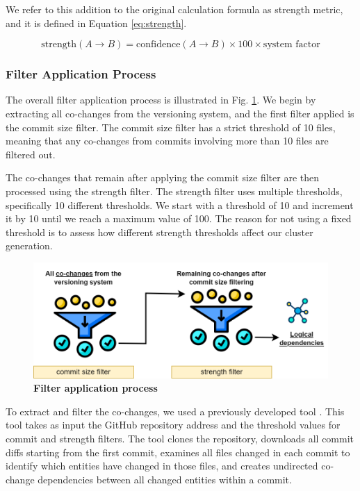 \documentclass{ieeeaccess}
\begin{document}
We refer to this addition to the original calculation formula as strength metric, and it is defined in Equation \eqref{eq:strength}.

\begin{equation}
\text{strength}(A \rightarrow B) = \text{confidence}(A \rightarrow B) \times 100 \times \text{system factor} 
\label{eq:strength}
\end{equation}


\subsubsection{Filter Application Process}

The overall filter application process is illustrated in Fig. \ref{fig:filtering}.  We begin by extracting all co-changes from the versioning system, and the first filter applied is the commit size filter. The commit size filter has a strict threshold of 10 files, meaning that any co-changes from commits involving more than 10 files are filtered out.

The co-changes that remain after applying the commit size filter are then processed using the strength filter. The strength filter uses multiple thresholds, specifically 10 different thresholds. We start with a threshold of 10 and increment it by 10 until we reach a maximum value of 100. The reason for not using a fixed threshold is to assess how different strength thresholds affect our cluster generation. 

\begin{figure}[t!]
  \centering
  \includegraphics[width=\columnwidth]{filtering.png}
  \caption{ \textbf{Filter application process}}
  \label{fig:filtering}
\end{figure}

To extract and filter the co-changes, we used a previously developed tool \cite{b4}. This tool takes as input the GitHub repository address and the threshold values for commit and strength filters. The tool clones the repository, downloads all commit diffs starting from the first commit, examines all files changed in each commit to identify which entities have changed in those files, and creates undirected co-change dependencies between all changed entities within a commit.
\end{document}
